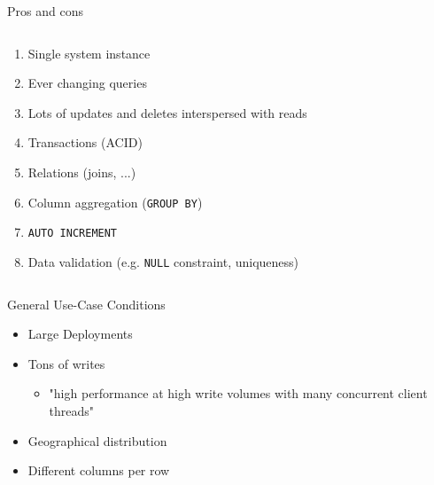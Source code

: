 \documentclass[
  10pt
]{beamer}
\begin{document}
\begin{frame}{Pros and cons}
\begin{columns}[T]
\begin{column}{0.45\textwidth}
      \begin{enumerate}[\textbf{\textcolor{aswe-preferences}{-}}]
        \item<11-> Single system instance
        \item<12-> Ever changing queries
        \item<13-> Lots of updates and deletes interspersed with reads
        \item<14-> Transactions (ACID)
        \item<15-> Relations (joins, ...)
        \item<16-> Column aggregation (\lstinline{GROUP BY})
        \item<17-> \lstinline{AUTO INCREMENT}
        \item<18-> Data validation (e.g. \lstinline{NULL} constraint, uniqueness)
      \end{enumerate}
    \end{column}
  \end{columns}
\end{frame}

\begin{frame}{General Use-Case Conditions \cite{cassandra_oreilly, cassandra_paper}}
 \begin{itemize}
    \item<1-> Large Deployments
    \item<2-> Tons of writes
      \begin{itemize}
        \item "high performance at high write volumes with many concurrent client threads" \cite{cassandra_oreilly}
      \end{itemize}
    \item<3-> Geographical distribution
    \item<4-> Different columns per row
 \end{itemize}


\end{frame}
\end{document}
